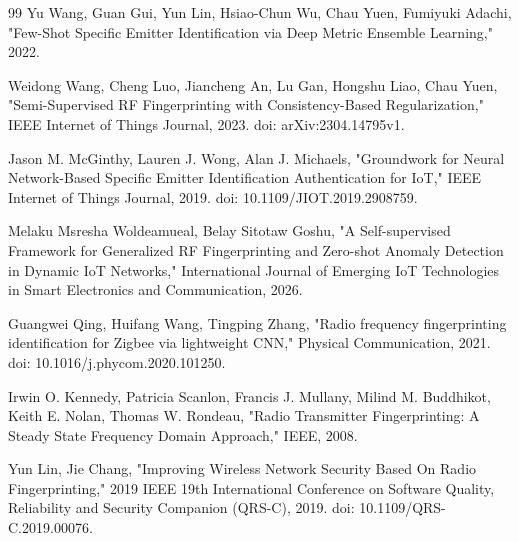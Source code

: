 \documentclass[conference]{IEEEtran}
\begin{document}
\begin{thebibliography}{99}
Yu Wang, Guan Gui, Yun Lin, Hsiao-Chun Wu, Chau Yuen, Fumiyuki Adachi, "Few-Shot Specific Emitter Identification via Deep Metric Ensemble Learning," 2022.

Weidong Wang, Cheng Luo, Jiancheng An, Lu Gan, Hongshu Liao, Chau Yuen, "Semi-Supervised RF Fingerprinting with Consistency-Based Regularization," IEEE Internet of Things Journal, 2023. doi: arXiv:2304.14795v1.

Jason M. McGinthy, Lauren J. Wong, Alan J. Michaels, "Groundwork for Neural Network-Based Specific Emitter Identification Authentication for IoT," IEEE Internet of Things Journal, 2019. doi: 10.1109/JIOT.2019.2908759.

Melaku Msresha Woldeamueal, Belay Sitotaw Goshu, "A Self-supervised Framework for Generalized RF Fingerprinting and Zero-shot Anomaly Detection in Dynamic IoT Networks," International Journal of Emerging IoT Technologies in Smart Electronics and Communication, 2026.

Guangwei Qing, Huifang Wang, Tingping Zhang, "Radio frequency fingerprinting identification for Zigbee via lightweight CNN," Physical Communication, 2021. doi: 10.1016/j.phycom.2020.101250.

Irwin O. Kennedy, Patricia Scanlon, Francis J. Mullany, Milind M. Buddhikot, Keith E. Nolan, Thomas W. Rondeau, "Radio Transmitter Fingerprinting: A Steady State Frequency Domain Approach," IEEE, 2008.

Yun Lin, Jie Chang, "Improving Wireless Network Security Based On Radio Fingerprinting," 2019 IEEE 19th International Conference on Software Quality, Reliability and Security Companion (QRS-C), 2019. doi: 10.1109/QRS-C.2019.00076.

\end{thebibliography}
\end{document}
